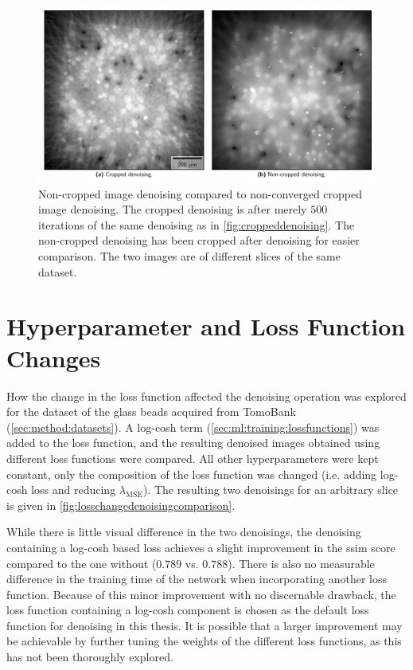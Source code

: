 \begin{figure}[htbp]
  \centering
  \includegraphics[width=.9\textwidth]{figures/croppednoncroppedearly.pdf}
  \caption[Non-cropped image denoising compared to non-converged cropped image denoising]{Non-cropped image denoising compared to non-converged cropped image denoising. The cropped denoising is after merely $500$ iterations of the same denoising as in \cref{fig:croppeddenoising}. The non-cropped denoising has been cropped after denoising for easier comparison. The two images are of different slices of the same dataset. }
  \label{fig:croppednoncroppedearly}
\end{figure}

\section{Hyperparameter and Loss Function Changes}
How the change in the loss function affected the denoising operation was explored for the dataset of the glass beads acquired from TomoBank (\cref{sec:method:datasets}). A log-cosh term (\cref{sec:ml:training:lossfunctions}) was added to the loss function, and the resulting denoised images obtained using different loss functions were compared. All other hyperparameters were kept constant, only the composition of the loss function was changed (i.e. adding log-cosh loss and reducing $\lambda_{\text{MSE}}$). The resulting two denoisings for an arbitrary slice is given in \cref{fig:losschangedenoisingcomparison}. 

While there is little visual difference in the two denoisings, the denoising containing a log-cosh based loss achieves a slight improvement in the \gls{ssim} score compared to the one without ($0.789$ vs. $0.788$). There is also no measurable difference in the training time of the network when incorporating another loss function. Because of this minor improvement with no discernable drawback, the loss function containing a log-cosh component is chosen as the default loss function for denoising in this thesis. It is possible that a larger improvement may be achievable by further tuning the weights of the different loss functions, as this has not been thoroughly explored. 

